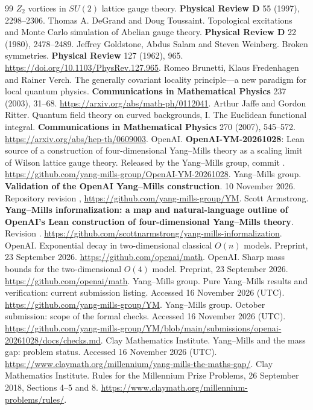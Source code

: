 \begin{thebibliography}{99}
$Z_2$ vortices in $SU(2)$ lattice gauge theory. \textbf{Physical Review D} 55
(1997), 2298--2306.
Thomas A. DeGrand and Doug Toussaint. Topological excitations and Monte Carlo
simulation of Abelian gauge theory. \textbf{Physical Review D} 22 (1980),
2478--2489.
Jeffrey Goldstone, Abdus Salam and Steven Weinberg. Broken symmetries.
\textbf{Physical Review} 127 (1962), 965.
\url{https://doi.org/10.1103/PhysRev.127.965}.
Romeo Brunetti, Klaus Fredenhagen and Rainer Verch.
The generally covariant locality principle---a new paradigm for local
quantum physics. \textbf{Communications in Mathematical Physics}
237 (2003), 31--68. \url{https://arxiv.org/abs/math-ph/0112041}.
Arthur Jaffe and Gordon Ritter. Quantum field theory on curved
backgrounds, I. The Euclidean functional integral.
\textbf{Communications in Mathematical Physics} 270 (2007), 545--572.
\url{https://arxiv.org/abs/hep-th/0609003}.
OpenAI. \textbf{OpenAI-YM-20261028}: Lean source of a construction of
four-dimensional Yang--Mills theory as a scaling limit of Wilson lattice
gauge theory. Released by the Yang--Mills group, commit .
\url{https://github.com/yang-mills-group/OpenAI-YM-20261028}.
Yang--Mills group. \textbf{Validation of the OpenAI Yang--Mills
construction}. 10 November 2026. Repository revision ,
\url{https://github.com/yang-mills-group/YM}.
Scott Armstrong. \textbf{Yang--Mills informalization: a map and
natural-language outline of OpenAI's Lean construction of four-dimensional
Yang--Mills theory}. Revision .
\url{https://github.com/scottnarmstrong/yang-mills-informalization}.
OpenAI. Exponential decay in two-dimensional classical $O(n)$ models.
Preprint, 23 September 2026. \url{https://github.com/openai/math}.
OpenAI. Sharp mass bounds for the two-dimensional $O(4)$ model. Preprint,
23 September 2026. \url{https://github.com/openai/math}.
Yang--Mills group. Pure Yang--Mills results and verification: current submission
listing. Accessed 16 November 2026 (UTC).
\url{https://github.com/yang-mills-group/YM}.
Yang--Mills group. October submission: scope of the formal checks.
Accessed 16 November 2026 (UTC).
\url{https://github.com/yang-mills-group/YM/blob/main/submissions/openai-20261028/docs/checks.md}.
Clay Mathematics Institute. Yang--Mills and the mass gap: problem status.
Accessed 16 November 2026 (UTC).
\url{https://www.claymath.org/millennium/yang-mills-the-maths-gap/}.
Clay Mathematics Institute. Rules for the Millennium Prize Problems,
26 September 2018, Sections 4--5 and 8.
\url{https://www.claymath.org/millennium-problems/rules/}.
\end{thebibliography}

